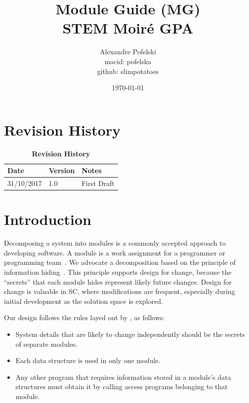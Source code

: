 \documentclass[12pt, titlepage]{article}
\begin{document}
\title{Module Guide (MG) \\
STEM Moir{\'e} GPA} 
\author{Alexandre Pofelski \\
		macid: pofelska \\
		github: slimpotatoes}
\date{\today}

\maketitle


\section{Revision History}

\begin{table}[h]
\caption{\bf Revision History}
\begin{tabularx}{\textwidth}{p{3cm}p{2cm}X}
\toprule {\bf Date} & {\bf Version} & {\bf Notes}\\
\midrule
31/10/2017 & 1.0 & First Draft\\
\bottomrule
\end{tabularx}
\end{table}

\newpage

\tableofcontents

\listoftables

\listoffigures

\newpage


\section{Introduction}

\iffalse
Decomposing a system into modules is a commonly accepted approach to developing
software.  A module is a work assignment for a programmer or programming
team~\cite{ParnasEtAl1984}.  We advocate a decomposition
based on the principle of information hiding~\cite{Parnas1972a}.  This
principle supports design for change, because the ``secrets'' that each module
hides represent likely future changes.  Design for change is valuable in SC,
where modifications are frequent, especially during initial development as the
solution space is explored.  

Our design follows the rules layed out by \cite{ParnasEtAl1984}, as follows:
\begin{itemize}
\item System details that are likely to change independently should be the
  secrets of separate modules.
\item Each data structure is used in only one module.
\item Any other program that requires information stored in a module's data
  structures must obtain it by calling access programs belonging to that module.
\end{itemize}
\end{document}
